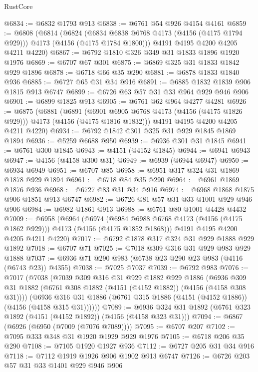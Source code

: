 \begin{lexlean}{RustCore}
\begin{coremodule}
@6834 := @6832 @1793 @913
@6838 := @6761 @54 @926 @4154 @4161
@6859 := @6808
    (@6814
      (@6824 (@6834 @6838 @6768 @4173 (@4156 (@4175 @1794 @929))) @4173 (@4156 (@4175 @1784 @1800)))
      @4191
      @4195
      @4200
      @4205
      @4211
      @4220)
@6867 := @6792 @1810 @326 @349 @31 @1833 @1896 @1920 @1976
@6869 := @6707 @67 @301
@6875 := @6869 @325 @31 @1833 @1842 @929 @1896
@6878 := @6718 @66 @35 @290
@6881 := @6878 @1833 @1840 @936
@6885 := @6727 @65 @31 @34 @916
@6891 := @6885 @1832 @1839 @906 @1815 @913 @6747
@6899 := @6726 @63 @57 @31 @33 @964 @929 @946 @906
@6901 := @6899 @1825 @913
@6905 := @6761 @62 @964 @4277 @4281
@6926 := @6875
    (@6881
      (@6891 (@6901 @6905 @6768 @4173 (@4156 (@4175 @1826 @929))) @4173 (@4156 (@4175 @1816 @1832)))
      @4191
      @4195
      @4200
      @4205
      @4211
      @4220)
@6934 := @6792 @1842 @301 @325 @31 @929 @1845 @1869 @1894
@6936 := @5259 @6688 @950
@6939 := @6936 @301 @31 @1845
@6941 := @6761 @300 @1845
@6943 := @4151 (@4152 @1845)
@6944 := @6941 @6943
@6947 := @4156 (@4158 @300 @31)
@6949 := @6939 (@6944 @6947)
@6950 := @6934 @6949
@6951 := @6707 @85
@6958 := @6951 @317 @324 @31 @1869 @1878 @929 @1894
@6961 := @6718 @84 @35 @290
@6964 := @6961 @1869 @1876 @936
@6968 := @6727 @83 @31 @34 @916
@6974 := @6968 @1868 @1875 @906 @1851 @913 @6747
@6982 := @6726 @81 @57 @31 @33 @1001 @929 @946 @906
@6984 := @6982 @1861 @913
@6988 := @6761 @80 @1001 @4428 @4432
@7009 := @6958
    (@6964
      (@6974 (@6984 @6988 @6768 @4173 (@4156 (@4175 @1862 @929))) @4173 (@4156 (@4175 @1852 @1868)))
      @4191
      @4195
      @4200
      @4205
      @4211
      @4220)
@7017 := @6792 @1878 @317 @324 @31 @929 @1888 @929 @1892
@7018 := @6707 @71
@7025 := @7018 @309 @316 @31 @929 @983 @929 @1888
@7037 := @6936 @71 @290 @983 (@6738 @23 @290 @23 @983 (@4116 (@6743 @23)) @4355)
@7038 := @7025 @7037
@7039 := @6792 @983
@7076 := @7017
    (@7038
      (@7039
        @309
        @316
        @31
        @929
        @1882
        @929
        @1886
        (@6936 @309 @31 @1882 (@6761 @308 @1882 (@4151 (@4152 @1882)) (@4156 (@4158 @308 @31))))
        (@6936 @316 @31 @1886 (@6761 @315 @1886 (@4151 (@4152 @1886)) (@4156 (@4158 @315 @31))))))
@7089 := @6936 @324 @31 @1892 (@6761 @323 @1892 (@4151 (@4152 @1892)) (@4156 (@4158 @323 @31)))
@7094 := @6867 (@6926 (@6950 (@7009 (@7076 @7089))))
@7095 := @6707 @207
@7102 := @7095 @333 @348 @31 @1920 @1929 @929 @1976
@7105 := @6718 @206 @35 @290
@7108 := @7105 @1920 @1927 @936
@7112 := @6727 @205 @31 @34 @916
@7118 := @7112 @1919 @1926 @906 @1902 @913 @6747
@7126 := @6726 @203 @57 @31 @33 @1401 @929 @946 @906

\end{coremodule}
\end{lexlean}
